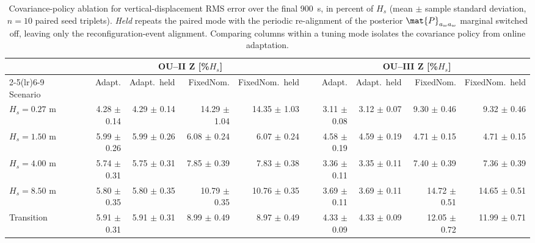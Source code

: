 \begin{table}[t]
  \centering
  \caption{Covariance-policy ablation for vertical-displacement RMS error over the final \SI{900}{s}, in percent of $H_s$ (mean $\pm$ sample standard deviation, $n=10$ paired seed triplets). \emph{Held} repeats the paired mode with the periodic re-alignment of the posterior $\mat{P}_{a_w a_w}$ marginal switched off, leaving only the reconfiguration-event alignment. Comparing columns within a tuning mode isolates the covariance policy from online adaptation.}
  \label{tab:ou_mc_covsync}
  \footnotesize
  \setlength{\tabcolsep}{3.2pt}
  \begin{tabular}{@{}lrrrrrrrr@{}}
    \toprule
    & \multicolumn{4}{c}{OU--II Z [\%$H_s$]} & \multicolumn{4}{c}{OU--III Z [\%$H_s$]} \\
    \cmidrule(lr){2-5}\cmidrule(lr){6-9}
    Scenario & Adapt. & Adapt.\ held & FixedNom. & FixedNom.\ held & Adapt. & Adapt.\ held & FixedNom. & FixedNom.\ held \\
    \midrule
    $H_s=0.27$ m & 4.28 $\pm$ 0.14 & 4.29 $\pm$ 0.14 & 14.29 $\pm$ 1.04 & 14.35 $\pm$ 1.03 & 3.11 $\pm$ 0.08 & 3.12 $\pm$ 0.07 & 9.30 $\pm$ 0.46 & 9.32 $\pm$ 0.46 \\
    $H_s=1.50$ m & 5.99 $\pm$ 0.26 & 5.99 $\pm$ 0.26 & 6.08 $\pm$ 0.24 & 6.07 $\pm$ 0.24 & 4.58 $\pm$ 0.19 & 4.59 $\pm$ 0.19 & 4.71 $\pm$ 0.15 & 4.71 $\pm$ 0.15 \\
    $H_s=4.00$ m & 5.74 $\pm$ 0.31 & 5.75 $\pm$ 0.31 & 7.85 $\pm$ 0.39 & 7.83 $\pm$ 0.38 & 3.36 $\pm$ 0.11 & 3.35 $\pm$ 0.11 & 7.40 $\pm$ 0.39 & 7.36 $\pm$ 0.39 \\
    $H_s=8.50$ m & 5.80 $\pm$ 0.35 & 5.80 $\pm$ 0.35 & 10.79 $\pm$ 0.35 & 10.76 $\pm$ 0.35 & 3.69 $\pm$ 0.11 & 3.69 $\pm$ 0.11 & 14.72 $\pm$ 0.51 & 14.65 $\pm$ 0.51 \\
    Transition & 5.91 $\pm$ 0.31 & 5.91 $\pm$ 0.31 & 8.99 $\pm$ 0.49 & 8.97 $\pm$ 0.49 & 4.33 $\pm$ 0.09 & 4.33 $\pm$ 0.09 & 12.05 $\pm$ 0.72 & 11.99 $\pm$ 0.71 \\
    \bottomrule
  \end{tabular}
\end{table}


